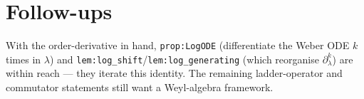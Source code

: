 \documentclass[11pt]{article}
\begin{document}
\section{Follow-ups}
With the order-derivative in hand, \texttt{prop:LogODE} (differentiate the Weber ODE $k$ times in
$\lambda$) and \texttt{lem:log\_shift}/\texttt{lem:log\_generating} (which reorganise
$\partial_\lambda^k$) are within reach --- they iterate this identity. The remaining ladder-operator and
commutator statements still want a Weyl-algebra framework.
\end{document}
